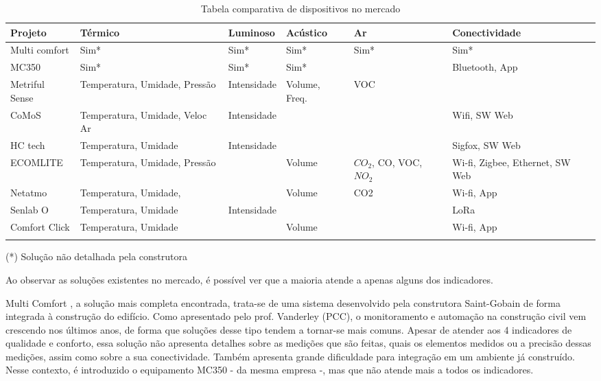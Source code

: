 \documentclass[../monografia.tex]{subfiles}
\begin{document}
\begin{center}
\begin{longtable}{ | m{2.5cm} | m{2.4cm}| m{2.2cm} |m{2cm} |m{2cm} |m{2.8cm} | } 
\hline
\textbf{Projeto} & \textbf{Térmico} & \textbf{Luminoso} & \textbf{Acústico} & \textbf{Ar} & \textbf{Conectividade} \\ 
\hline
Multi comfort \cite{multicomfort} & Sim* & Sim* & Sim* & Sim* & Sim* \\
\hline
MC350\cite{mc350} & Sim* & Sim* & Sim* & & Bluetooth, App \\
\hline
Metriful Sense\cite{metriful} & Temperatura, Umidade, Pressão & Intensidade & Volume, Freq. & VOC & \\
\hline
CoMoS\cite{CoMoS} & Temperatura, Umidade, Veloc Ar & Intensidade & & & Wifi, SW Web \\ 
\hline
HC tech\cite{HCTech} & Temperatura, Umidade & Intensidade & & & Sigfox, SW Web\\ 
\hline
ECOMLITE \cite{ECOMLITE} & Temperatura, Umidade, Pressão & & Volume & $CO_{2}$, CO, VOC, $NO_{2}$ & Wi-fi, Zigbee, Ethernet, SW Web \\ 
\hline
Netatmo\cite{netatmo} & Temperatura, Umidade, & & Volume & CO2 & Wi-fi, App\\ 
\hline
Senlab O\cite{Senlab} & Temperatura, Umidade & Intensidade & & & LoRa \\ \hline
Comfort Click\cite{comfortclick} & Temperatura, Umidade & & Volume & & Wi-fi, App\\ 
\hline
\caption{Tabela comparativa de dispositivos no mercado}
\label{table}
\end{longtable}
\end{center}

\begin{flushright}
(*) Solução não detalhada pela construtora
\end{flushright}


Ao observar as soluções existentes no mercado, é possível ver que a maioria atende a apenas alguns dos indicadores. 

Multi Comfort \cite{multicomfort}, a solução mais completa encontrada, trata-se de uma sistema desenvolvido pela construtora Saint-Gobain de forma integrada à construção do edifício. Como apresentado pelo prof. Vanderley (PCC), o monitoramento e automação na construção civil vem crescendo nos últimos anos, de forma que soluções desse tipo tendem a tornar-se mais comuns. 
Apesar de atender aos 4 indicadores de qualidade e conforto, essa solução não apresenta detalhes sobre as medições que são feitas, quais os elementos medidos ou a precisão dessas medições, assim como sobre a sua conectividade. Também apresenta grande dificuldade para integração em um ambiente já construído. Nesse contexto, é introduzido o equipamento MC350\cite{mc350} - da mesma empresa -, mas que não atende mais a todos os indicadores. 
\end{document}
